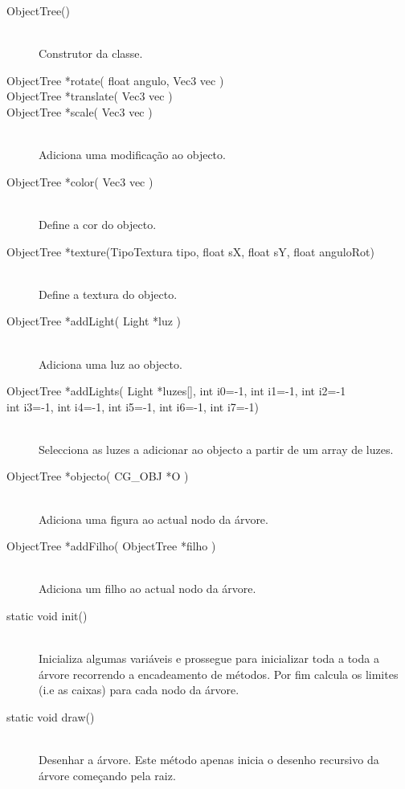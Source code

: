 \documentclass[a5paper,onecolumn, 11pt]{article}
\begin{document}
\begin{description}
	\item[ObjectTree()] \hfill \\
	Construtor da classe.

	\item[ObjectTree *rotate( float angulo, Vec3 vec )]
	\item[ObjectTree *translate( Vec3 vec )]
	\item[ObjectTree *scale( Vec3 vec )] \hfill \\
	Adiciona uma modificação ao objecto.

	\item[ObjectTree *color( Vec3 vec )] \hfill \\
	Define a cor do objecto.

	\item[ObjectTree *texture(TipoTextura tipo, float sX, float sY, float anguloRot)] \hfill \\
	Define a textura do objecto.

	\item[ObjectTree *addLight( Light *luz )] \hfill \\
	Adiciona uma luz ao objecto.

	\item[ObjectTree *addLights( Light *luzes{[]}, int i0=-1, int i1=-1, int i2=-1]
	\item[int i3=-1, int i4=-1, int i5=-1, int i6=-1, int i7=-1)] \hfill \\
	Selecciona as luzes a adicionar ao objecto a partir de um array de luzes.

	\item[ObjectTree *objecto( CG\_OBJ *O )] \hfill \\
	Adiciona uma figura ao actual nodo da árvore.

	\item[ObjectTree *addFilho( ObjectTree *filho )] \hfill \\
	Adiciona um filho ao actual nodo da árvore.

	\item[static void init()] \hfill \\
	Inicializa algumas variáveis e prossegue para inicializar toda a toda a árvore recorrendo a encadeamento de métodos. Por fim calcula os limites (i.e as caixas) para cada nodo da árvore.

	\item[static void draw()] \hfill \\
	Desenhar a árvore. Este método apenas inicia o desenho recursivo da árvore começando pela raiz.
\end{description}
\end{document}
